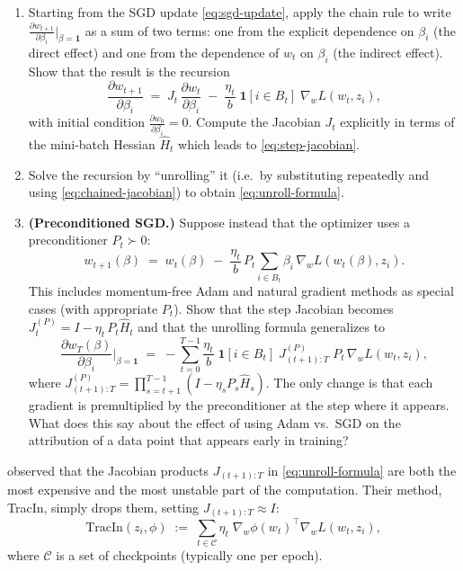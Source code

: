 \documentclass[11pt]{article}
\begin{document}
\begin{exercise}\label{ex:unroll-derive}
\begin{enumerate}
  \item[(a)] Starting from the SGD update \eqref{eq:sgd-update}, apply the chain rule to write $\tfrac{\partial w_{t+1}}{\partial \beta_i}\big|_{\beta=\mathbf{1}}$ as a sum of two terms: one from the explicit dependence on $\beta_i$ (the direct effect) and one from the dependence of $w_t$ on $\beta_i$ (the indirect effect). Show that the result is the recursion
  \[
    \frac{\partial w_{t+1}}{\partial \beta_i} \;=\; J_t\,\frac{\partial w_t}{\partial \beta_i} \;-\; \frac{\eta_t}{b}\;\mathbf{1}[i\in B_t]\;\nabla_w L(w_t,z_i),
  \]
  with initial condition $\tfrac{\partial w_0}{\partial \beta_i} = 0$. Compute the Jacobian $J_t$ explicitly in terms of the mini-batch Hessian $\widehat{H}_t$ which leads to \eqref{eq:step-jacobian}.
  \item[(b)] Solve the recursion by ``unrolling'' it (i.e.\ by substituting repeatedly and using \eqref{eq:chained-jacobian}) to obtain \eqref{eq:unroll-formula}.
  \item[(c)] \textbf{(Preconditioned SGD.)} Suppose instead that the optimizer uses a preconditioner $P_t \succ 0$:
  \begin{equation}\label{eq:precond-update}
    w_{t+1}(\beta) \;=\; w_t(\beta) \;-\; \frac{\eta_t}{b}\,P_t\sum_{i\in B_t}\beta_i\,\nabla_w L(w_t(\beta),z_i).
  \end{equation}
  This includes momentum-free Adam and natural gradient methods as special cases (with appropriate $P_t$). Show that the step Jacobian becomes $J_t^{(P)} = I - \eta_t\,P_t\widehat{H}_t$ and that the unrolling formula generalizes to
  \begin{equation}\label{eq:unroll-precond}
    \frac{\partial w_T(\beta)}{\partial \beta_i}\bigg\rvert_{\beta=\mathbf{1}} \;=\; -\sum_{t=0}^{T-1}\frac{\eta_t}{b}\;\mathbf{1}[i\in B_t]\;J_{(t+1):T}^{(P)}\;P_t\,\nabla_w L(w_t,z_i),
  \end{equation}
  where $J_{(t+1):T}^{(P)} = \prod_{s=t+1}^{T-1}(I - \eta_s P_s\widehat{H}_s)$. The only change is that each gradient is premultiplied by the preconditioner at the step where it appears. What does this say about the effect of using Adam vs.\ SGD on the attribution of a data point that appears early in training?
\end{enumerate}
\end{exercise}

\begin{remark}[TracIn]\label{rem:tracin}
\citet{pruthi2020estimating} observed that the Jacobian products $J_{(t+1):T}$ in \eqref{eq:unroll-formula} are both the most expensive and the most unstable part of the computation. Their method, TracIn, simply drops them, setting $J_{(t+1):T} \approx I$:
\begin{equation}\label{eq:tracin}
  \mathrm{TracIn}(z_i,\phi) \;:=\; \sum_{t\in\mathcal{C}}\eta_t\;\nabla_w\phi(w_t)^\top\nabla_w L(w_t,z_i),
\end{equation}
where $\mathcal{C}$ is a set of checkpoints (typically one per epoch).
\end{remark}
\end{document}
